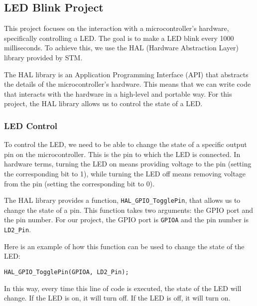 \subsection{LED Blink Project}

This project focuses on the interaction with a microcontroller's hardware, specifically controlling a LED. The goal is to make a LED blink every 1000 milliseconds. To achieve this, we use the HAL (Hardware Abstraction Layer) library provided by STM.

The HAL library is an Application Programming Interface (API) that abstracts the details of the microcontroller's hardware. This means that we can write code that interacts with the hardware in a high-level and portable way. For this project, the HAL library allows us to control the state of a LED.

\subsubsection{LED Control}

To control the LED, we need to be able to change the state of a specific output pin on the microcontroller. This is the pin to which the LED is connected. In hardware terms, turning the LED on means providing voltage to the pin (setting the corresponding bit to 1), while turning the LED off means removing voltage from the pin (setting the corresponding bit to 0).

The HAL library provides a function, \texttt{HAL\_GPIO\_TogglePin}, that allows us to change the state of a pin. This function takes two arguments: the GPIO port and the pin number. For our project, the GPIO port is \texttt{GPIOA} and the pin number is \texttt{LD2\_Pin}.

Here is an example of how this function can be used to change the state of the LED:

\begin{verbatim}
HAL_GPIO_TogglePin(GPIOA, LD2_Pin);
\end{verbatim}

In this way, every time this line of code is executed, the state of the LED will change. If the LED is on, it will turn off. If the LED is off, it will turn on.